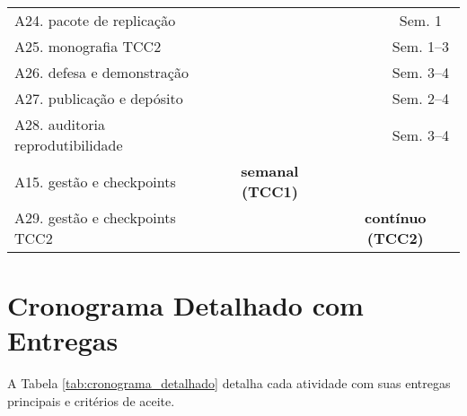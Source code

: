 \begin{table}[htb]
{\begin{tabular}{lcccccccc}
A24. pacote de replicação & & & & & & & & Sem. 1 \\
A25. monografia TCC2 & & & & & & & & Sem. 1–3 \\
A26. defesa e demonstração & & & & & & & & Sem. 3–4 \\
A27. publicação e depósito & & & & & & & & Sem. 2–4 \\
A28. auditoria reprodutibilidade & & & & & & & & Sem. 3–4 \\
\midrule
A15. gestão e checkpoints & \multicolumn{4}{c}{\textbf{semanal (TCC1)}} & & & & \\
A29. gestão e checkpoints TCC2 & & & & & \multicolumn{4}{c}{\textbf{contínuo (TCC2)}} \\
\bottomrule
\end{tabular}%
}
\end{table}

\section{Cronograma Detalhado com Entregas}

A Tabela \ref{tab:cronograma_detalhado} detalha cada atividade com suas entregas principais e critérios de aceite.

